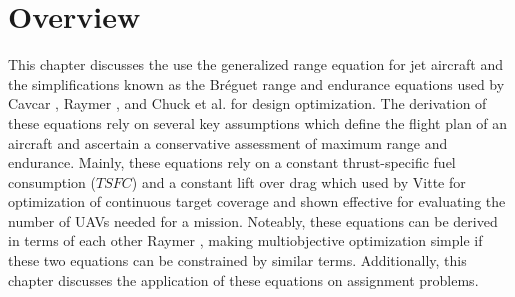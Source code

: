\section{Overview}
\hspace{0.5cm} This chapter discusses the use the generalized range equation for jet aircraft and the simplifications known as the Br\'eguet range and endurance equations used by  Cavcar \cite{breguetRangeEqn}, Raymer \cite{LoiterTimeFromRange}, and Chuck et al. \cite{fuelsLOGRange} for design optimization. The derivation of these equations rely on several key assumptions which define the flight plan of an aircraft and ascertain a conservative assessment of maximum range and endurance. Mainly, these equations rely on a constant thrust-specific fuel consumption ($TSFC$) and a constant lift over drag which used by Vitte \cite{OptimizeBreguet} for optimization of continuous target coverage and shown effective for evaluating the number of UAVs needed for a mission. Noteably, these equations can be derived in terms of each other Raymer \cite{LoiterTimeFromRange}, making multiobjective optimization simple if these two equations can be constrained by similar terms. Additionally, this chapter discusses the application of these equations on assignment problems. 

